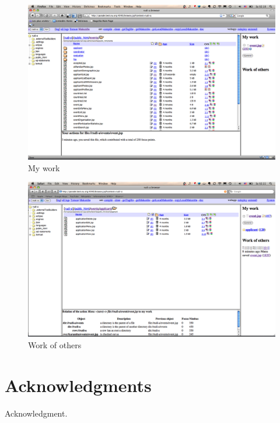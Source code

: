 \documentclass{ecscw2007}
\begin{document}
\begin{figure}[thb]
  \centering
  \includegraphics[width=.9\linewidth]{my-work}
  \caption{My work}
  \label{fig:my-work}
\end{figure}

\begin{figure}[thb]
  \centering
  \includegraphics[width=.9\linewidth]{work-others}
  \caption{Work of others}
  \label{fig:work-others}
\end{figure}



\section*{Acknowledgments} 

{\footnotesize Acknowledgment. }




  
\end{document}
